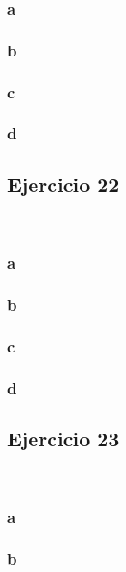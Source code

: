 \documentclass{article}
\begin{document}
\subsubsection*{a}

\subsubsection*{b}

\subsubsection*{c}

\subsubsection*{d}

\subsection*{Ejercicio 22}

\

\subsubsection*{a}

\subsubsection*{b}

\subsubsection*{c}

\subsubsection*{d}

\subsection*{Ejercicio 23}

\

\subsubsection*{a}

\subsubsection*{b}
\end{document}
